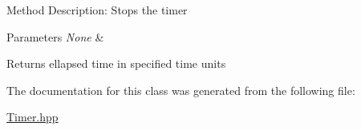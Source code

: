 Method Description\+: Stops the timer


\begin{DoxyParams}{Parameters}
{\em None} & \\
\hline
\end{DoxyParams}
\begin{DoxyReturn}{Returns}
ellapsed time in specified time units 
\end{DoxyReturn}


The documentation for this class was generated from the following file\+:\begin{DoxyCompactItemize}
\item 
\mbox{\hyperlink{_timer_8hpp}{Timer.\+hpp}}\end{DoxyCompactItemize}
